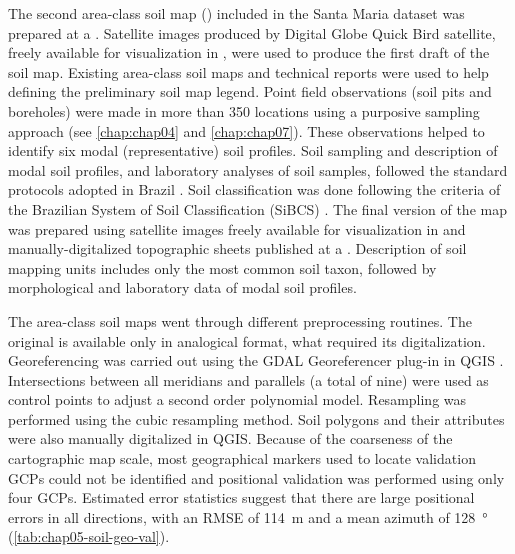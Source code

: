 The second area-class soil map (\soilNew) included in the Santa Maria dataset \cite{Miguel2010} was prepared 
at a . Satellite images produced by Digital Globe\textregistered{} Quick Bird satellite, freely 
available for visualization in \googleearth, were used to produce the first draft of the soil 
map. Existing area-class soil maps and technical reports \cite{Pedron2005, Poelking2007, Sturmer2008} were 
used to help defining the preliminary soil map legend. Point field observations (soil pits and boreholes) were 
made in 
more than \num{350} locations using a purposive sampling approach (see \autoref{chap:chap04} and 
\autoref{chap:chap07}). These observations helped to identify six modal (representative) soil profiles. Soil 
sampling and description of modal soil profiles, and laboratory analyses of soil samples, followed the 
standard 
protocols adopted in Brazil \cite{ClaessenEtAl1997, 
SantosEtAl2005}. Soil classification was done following the criteria of the Brazilian System of Soil 
Classification (SiBCS) \cite{SantosEtAl2006}. The final version of the map was prepared using satellite images 
freely available for visualization in \googleearth{} and manually-digitalized topographic sheets 
published at a  \cite{DSG1992a, DSG1992}. Description of soil mapping units includes only the 
most common soil taxon, followed by morphological and laboratory data of modal soil profiles.

The area-class soil maps went through different preprocessing routines. The original \soilOld{} is available 
only in analogical format, what required its digitalization. Georeferencing was carried out using the GDAL 
Georeferencer plug-in in QGIS \cite{GDAL2013, QGIS2013}. Intersections between all meridians and parallels (a 
total of nine) were used as control points to adjust a second order polynomial model. Resampling was performed 
using the cubic resampling method. Soil polygons and their attributes were also manually digitalized in QGIS. 
Because of the coarseness of the cartographic map scale, most geographical markers used to locate validation 
GCPs could not be identified and positional validation was performed using only four GCPs. Estimated error 
statistics suggest that there are large positional errors in all directions, with an RMSE of \SI{114}{\m} and 
a mean azimuth of \SI{128}{\degree} (\autoref{tab:chap05-soil-geo-val}).

